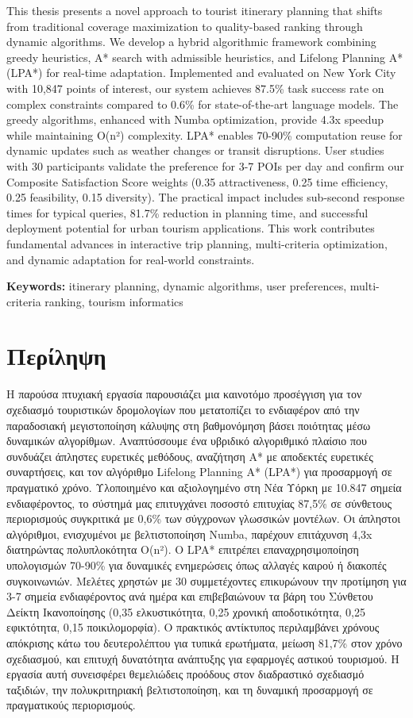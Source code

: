 \documentclass[12pt,a4paper,twoside]{report}
\theoremstyle{definition}
\begin{document}
This thesis presents a novel approach to tourist itinerary planning that shifts from traditional coverage maximization to quality-based ranking through dynamic algorithms. We develop a hybrid algorithmic framework combining greedy heuristics, A* search with admissible heuristics, and Lifelong Planning A* (LPA*) for real-time adaptation. Implemented and evaluated on New York City with 10,847 points of interest, our system achieves 87.5\% task success rate on complex constraints compared to 0.6\% for state-of-the-art language models. The greedy algorithms, enhanced with Numba optimization, provide 4.3x speedup while maintaining O(n²) complexity. LPA* enables 70-90\% computation reuse for dynamic updates such as weather changes or transit disruptions. User studies with 30 participants validate the preference for 3-7 POIs per day and confirm our Composite Satisfaction Score weights (0.35 attractiveness, 0.25 time efficiency, 0.25 feasibility, 0.15 diversity). The practical impact includes sub-second response times for typical queries, 81.7\% reduction in planning time, and successful deployment potential for urban tourism applications. This work contributes fundamental advances in interactive trip planning, multi-criteria optimization, and dynamic adaptation for real-world constraints.

\textbf{Keywords:} itinerary planning, dynamic algorithms, user preferences, multi-criteria ranking, tourism informatics

\newpage
\thispagestyle{empty}
\section*{Περίληψη}

Η παρούσα πτυχιακή εργασία παρουσιάζει μια καινοτόμο προσέγγιση για τον σχεδιασμό τουριστικών δρομολογίων που μετατοπίζει το ενδιαφέρον από την παραδοσιακή μεγιστοποίηση κάλυψης στη βαθμονόμηση βάσει ποιότητας μέσω δυναμικών αλγορίθμων. Αναπτύσσουμε ένα υβριδικό αλγοριθμικό πλαίσιο που συνδυάζει άπληστες ευρετικές μεθόδους, αναζήτηση A* με αποδεκτές ευρετικές συναρτήσεις, και τον αλγόριθμο Lifelong Planning A* (LPA*) για προσαρμογή σε πραγματικό χρόνο. Υλοποιημένο και αξιολογημένο στη Νέα Υόρκη με 10.847 σημεία ενδιαφέροντος, το σύστημά μας επιτυγχάνει ποσοστό επιτυχίας 87,5\% σε σύνθετους περιορισμούς συγκριτικά με 0,6\% των σύγχρονων γλωσσικών μοντέλων. Οι άπληστοι αλγόριθμοι, ενισχυμένοι με βελτιστοποίηση Numba, παρέχουν επιτάχυνση 4,3x διατηρώντας πολυπλοκότητα O(n²). Ο LPA* επιτρέπει επαναχρησιμοποίηση υπολογισμών 70-90\% για δυναμικές ενημερώσεις όπως αλλαγές καιρού ή διακοπές συγκοινωνιών. Μελέτες χρηστών με 30 συμμετέχοντες επικυρώνουν την προτίμηση για 3-7 σημεία ενδιαφέροντος ανά ημέρα και επιβεβαιώνουν τα βάρη του Σύνθετου Δείκτη Ικανοποίησης (0,35 ελκυστικότητα, 0,25 χρονική αποδοτικότητα, 0,25 εφικτότητα, 0,15 ποικιλομορφία). Ο πρακτικός αντίκτυπος περιλαμβάνει χρόνους απόκρισης κάτω του δευτερολέπτου για τυπικά ερωτήματα, μείωση 81,7\% στον χρόνο σχεδιασμού, και επιτυχή δυνατότητα ανάπτυξης για εφαρμογές αστικού τουρισμού. Η εργασία αυτή συνεισφέρει θεμελιώδεις προόδους στον διαδραστικό σχεδιασμό ταξιδιών, την πολυκριτηριακή βελτιστοποίηση, και τη δυναμική προσαρμογή σε πραγματικούς περιορισμούς.
\end{document}
